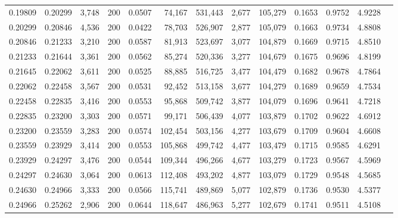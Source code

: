 \begin{tabular}{rrrrrrrrrrrrr}
0.19809 & 0.20299 & 3,748 & 200 &                                     0.0507 &  74,167 & 531,443 &   2,677 & 105,279 & 0.1653 & 0.9752 & 4.9228 \\
0.20299 & 0.20846 & 4,536 & 200 &                                     0.0422 &  78,703 & 526,907 &   2,877 & 105,079 & 0.1663 & 0.9734 & 4.8808 \\
0.20846 & 0.21233 & 3,210 & 200 &                                     0.0587 &  81,913 & 523,697 &   3,077 & 104,879 & 0.1669 & 0.9715 & 4.8510 \\
0.21233 & 0.21644 & 3,361 & 200 &                                     0.0562 &  85,274 & 520,336 &   3,277 & 104,679 & 0.1675 & 0.9696 & 4.8199 \\
0.21645 & 0.22062 & 3,611 & 200 &                                     0.0525 &  88,885 & 516,725 &   3,477 & 104,479 & 0.1682 & 0.9678 & 4.7864 \\
0.22062 & 0.22458 & 3,567 & 200 &                                     0.0531 &  92,452 & 513,158 &   3,677 & 104,279 & 0.1689 & 0.9659 & 4.7534 \\
0.22458 & 0.22835 & 3,416 & 200 &                                     0.0553 &  95,868 & 509,742 &   3,877 & 104,079 & 0.1696 & 0.9641 & 4.7218 \\
0.22835 & 0.23200 & 3,303 & 200 &                                     0.0571 &  99,171 & 506,439 &   4,077 & 103,879 & 0.1702 & 0.9622 & 4.6912 \\
0.23200 & 0.23559 & 3,283 & 200 &                                     0.0574 & 102,454 & 503,156 &   4,277 & 103,679 & 0.1709 & 0.9604 & 4.6608 \\
0.23559 & 0.23929 & 3,414 & 200 &                                     0.0553 & 105,868 & 499,742 &   4,477 & 103,479 & 0.1715 & 0.9585 & 4.6291 \\
0.23929 & 0.24297 & 3,476 & 200 &                                     0.0544 & 109,344 & 496,266 &   4,677 & 103,279 & 0.1723 & 0.9567 & 4.5969 \\
0.24297 & 0.24630 & 3,064 & 200 &                                     0.0613 & 112,408 & 493,202 &   4,877 & 103,079 & 0.1729 & 0.9548 & 4.5685 \\
0.24630 & 0.24966 & 3,333 & 200 &                                     0.0566 & 115,741 & 489,869 &   5,077 & 102,879 & 0.1736 & 0.9530 & 4.5377 \\
0.24966 & 0.25262 & 2,906 & 200 &                                     0.0644 & 118,647 & 486,963 &   5,277 & 102,679 & 0.1741 & 0.9511 & 4.5108 \\

\end{tabular}
